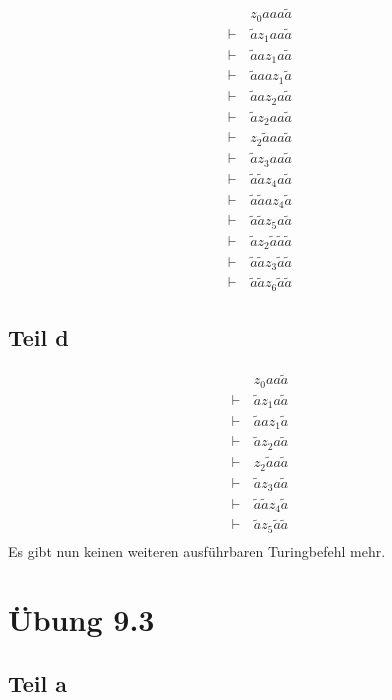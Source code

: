 \documentclass[10pt,a4paper]{article}
\begin{document}
\begin{align*}
  &\, z_{0}aaa\tilde{a}\\
  \vdash &\, \tilde{a}z_{1}aa\tilde{a}\\
  \vdash &\, \tilde{a}az_{1}a\tilde{a}\\
  \vdash &\, \tilde{a}aaz_{1}\tilde{a}\\
  \vdash &\, \tilde{a}az_{2}a\tilde{a}\\
  \vdash &\, \tilde{a}z_{2}aa\tilde{a}\\
  \vdash &\, z_{2}\tilde{a}aa\tilde{a}\\
  \vdash &\, \tilde{a}z_{3}aa\tilde{a}\\
  \vdash &\, \tilde{a}\tilde{a}z_{4}a\tilde{a}\\
  \vdash &\, \tilde{a}\tilde{a}az_{4}\tilde{a}\\
  \vdash &\, \tilde{a}\tilde{a}z_{5}a\tilde{a}\\
  \vdash &\, \tilde{a}z_{2}\tilde{a}\tilde{a}\tilde{a}\\
  \vdash &\, \tilde{a}\tilde{a}z_{3}\tilde{a}\tilde{a}\\
  \vdash &\, \tilde{a}\tilde{a}z_{6}\tilde{a}\tilde{a}
\end{align*}

\subsection{Teil d}

\begin{align*}
  &\, z_{0}aa\tilde{a}\\
  \vdash &\, \tilde{a}z_{1}a\tilde{a}\\
  \vdash &\, \tilde{a}az_{1}\tilde{a}\\
  \vdash &\, \tilde{a}z_{2}a\tilde{a}\\
  \vdash &\, z_{2}\tilde{a}a\tilde{a}\\
  \vdash &\, \tilde{a}z_{3}a\tilde{a}\\
  \vdash &\, \tilde{a}\tilde{a}z_{4}\tilde{a}\\
  \vdash &\, \tilde{a}z_{5}\tilde{a}\tilde{a}\\
\end{align*}
Es gibt nun keinen weiteren ausführbaren Turingbefehl mehr.

\section{Übung 9.3}

\subsection{Teil a}
\end{document}

